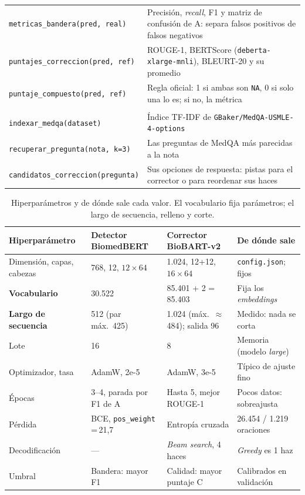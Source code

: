 \documentclass[11pt,a4paper]{article}
\newcommand{\fn}[1]{\texttt{\small #1}}
\begin{document}
{\begin{xltabular}{\textwidth}{>{\raggedright\arraybackslash}p{5.9cm} L}
\fn{metricas\_bandera(pred, real)} & Precisión, \emph{recall}, F1 y matriz de confusión de A: separa falsos positivos de falsos negativos \\
\fn{puntajes\_correccion(pred, ref)} & ROUGE-1, BERTScore (\fn{deberta-xlarge-mnli}), BLEURT-20 y su promedio \\
\fn{puntaje\_compuesto(pred, ref)} & Regla oficial: 1 si ambas son \texttt{NA}, 0 si solo una lo es; si no, la métrica \\
 \\
\fn{indexar\_medqa(dataset)} & Índice TF-IDF de \fn{GBaker/MedQA-USMLE-4-options} \\
\fn{recuperar\_pregunta(nota, k=3)} & Las preguntas de MedQA más parecidas a la nota \\
\fn{candidatos\_correccion(pregunta)} & Sus opciones de respuesta: pistas para el corrector o para reordenar sus haces \\
\bottomrule
\end{xltabular}
}

\begin{table}[H]
\centering\footnotesize
\setlength{\tabcolsep}{3pt}
\caption{Hiperparámetros y de dónde sale cada valor. El vocabulario fija parámetros; el largo de secuencia, relleno y corte.}
\label{tab:hiper}
\begin{tabularx}{\textwidth}{lllL}
\toprule
Hiperparámetro & Detector BiomedBERT & Corrector BioBART-v2 & De dónde sale \\
\midrule
Dimensión, capas, cabezas & 768, 12, $12 \times 64$ & 1.024, 12+12, $16 \times 64$ & \fn{config.json}; fijos \\
\textbf{Vocabulario} & 30.522 & 85.401 + 2 = 85.403 & Fija los \emph{embeddings} \\
\textbf{Largo de secuencia} & 512 (par máx.\ 425) & 1.024 (máx.\ $\approx$ 484); salida 96 & Medido: nada se corta \\
Lote & 16 & 8 & Memoria (modelo \emph{large}) \\
Optimizador, tasa & AdamW, 2e-5 & AdamW, 3e-5 & Típico de ajuste fino \\
Épocas & 3--4, parada por F1 de A & Hasta 5, mejor ROUGE-1 & Pocos datos: sobreajusta \\
Pérdida & BCE, \fn{pos\_weight}\,=\,21,7 & Entropía cruzada & 26.454 / 1.219 oraciones \\
Decodificación & --- & \emph{Beam search}, 4 haces & \emph{Greedy} es 1 haz \\
Umbral & Bandera: mayor F1 & Calidad: mayor puntaje C & Calibrados en validación \\
\bottomrule
\end{tabularx}
\end{table}
\end{document}
